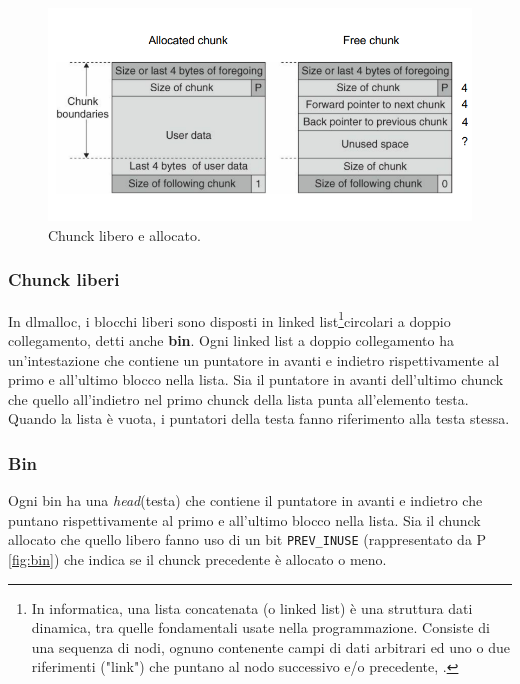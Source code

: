  \begin{figure}[H]
	\centering
    \includegraphics[width=14cm, keepaspectratio]{santini/img/cap_4/chuncks.png}
	\caption{Chunck libero e allocato.}\label{fig:chunck_lib_alloc}
\end{figure}

\subsubsection{Chunck liberi}
In dlmalloc, i blocchi liberi sono disposti in linked list\footnote{In informatica, una lista concatenata (o linked list) è una struttura dati dinamica, tra quelle fondamentali usate nella programmazione. Consiste di una sequenza di nodi, ognuno contenente campi di dati arbitrari ed uno o due riferimenti ("link") che puntano al nodo successivo e/o precedente, \cite{itwiki:126467077}.}circolari a doppio collegamento, detti anche \textbf{bin}. Ogni linked list a doppio collegamento ha un'intestazione che contiene un puntatore in avanti e indietro rispettivamente al primo e all'ultimo blocco nella lista. Sia il puntatore in avanti dell'ultimo chunck che quello all'indietro nel primo chunck della lista punta all'elemento testa. Quando la lista è vuota, i puntatori della testa fanno riferimento alla testa stessa.

\subsubsection{Bin}
Ogni bin ha una \textit{head}(testa) che contiene il puntatore in avanti e indietro che puntano rispettivamente al primo e all'ultimo blocco nella lista. Sia il chunck allocato che quello libero fanno uso di un bit \verb|PREV_INUSE| (rappresentato da P \ref{fig:bin}) che indica se il chunck precedente è allocato o meno.

